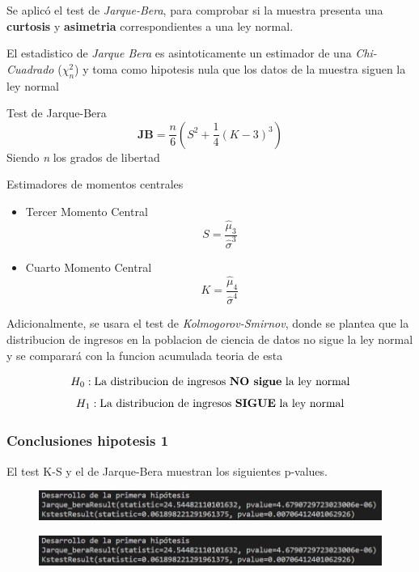 \documentclass{beamer}
\begin{document}
\begin{frame}

  Se aplicó el test de \textit{Jarque-Bera}, para comprobar si la muestra
  presenta una \textbf{curtosis} y \textbf{asimetria} correspondientes
  a una ley normal.

  El estadistico de \textit{Jarque Bera} es asintoticamente un estimador de
  una \textit{Chi-Cuadrado} (${\chi_n ^ 2}$) y toma como hipotesis nula que los datos de la
  muestra siguen la ley normal

  \begin{alertblock}{Test de Jarque-Bera}
    \[\textbf{JB} = \frac{n}{6}(S^2 +\frac{1}{4}(K - 3)^3)\] Siendo \textit{n} los grados de libertad
  \end{alertblock}

  \begin{block}{Estimadores de momentos centrales}
    \begin{itemize}
        \item Tercer Momento Central
          \[S = \frac{\hat{\mu}_3}{\hat{\sigma}^3}\]

        \item  Cuarto Momento Central
         \[K = \frac{\hat{\mu}_4}{\hat{\sigma}^4}\]
    \end{itemize}
  \end{block}
\end{frame}

\begin{frame}
  Adicionalmente, se usara el test de \textit{Kolmogorov-Smirnov}, donde se plantea
  que la distribucion de ingresos en la poblacion de ciencia de datos
  no sigue la ley normal y se comparará con la funcion acumulada teoria
  de esta

  \[H_0: \textrm{La distribucion de ingresos \textbf{NO sigue} la ley normal}\]
  \[H_1: \textrm{La distribucion de ingresos \textbf{SIGUE} la ley normal}\]

\end{frame}

\begin{frame}
\frametitle{Conclusiones hipotesis 1}
  El test K-S y el de Jarque-Bera muestran los siguientes p-values.
  \begin{figure}[t]
        \includegraphics[width=12cm]{p-val-1.jpg}
    \end{figure}
    \begin{figure}[t]
          \includegraphics[width=12cm]{p-val-1.jpg}
      \end{figure}
    \end{frame}
\end{document}
